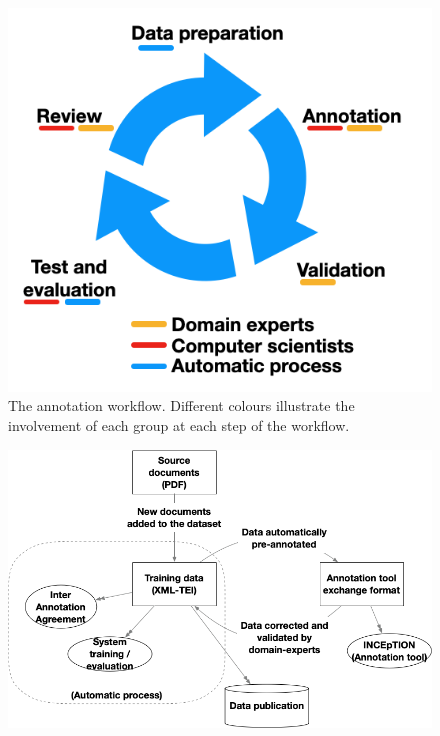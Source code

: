 \documentclass[fleqn,10pt]{wlscirep}
\begin{document}
\begin{figure}[htb]
\centering
  \centering
  \includegraphics[width=0.5\linewidth]{workflow-schema}
  \caption{The annotation workflow. Different colours illustrate the involvement of each group at each step of the workflow.}
  \label{fig:schema-comparison-modified-workflow}
\end{figure}

\begin{figure}[htb]
    \centering
    \includegraphics[width=\linewidth]{data-transformation.png}
    \label{fig:data-transformation}
\end{figure}
\end{document}
